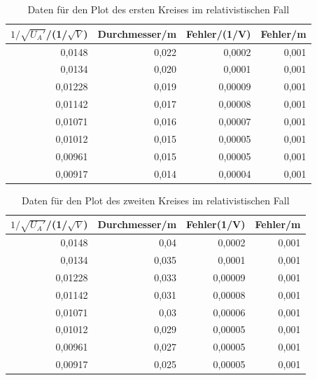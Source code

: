 \documentclass[12pt,a4paper]{article}
\begin{document}
\begin{table}[H]
\caption{Daten für den Plot des ersten Kreises im relativistischen Fall}
\begin{center}
\begin{tabular}{|r|r|r|r|}
\hline
\multicolumn{1}{|l|}{$1/\sqrt{U_A'}$/(1/$\sqrt{V}$)} & \multicolumn{1}{l|}{Durchmesser/m} & \multicolumn{1}{l|}{Fehler/(1/V)} & \multicolumn{1}{l|}{Fehler/m} \\ \hline
0,0148 & 0,022 & 0,0002 & 0,001 \\ \hline
0,0134 & 0,020 & 0,0001 & 0,001 \\ \hline
0,01228 & 0,019 & 0,00009 & 0,001 \\ \hline
0,01142 & 0,017 & 0,00008 & 0,001 \\ \hline
0,01071 & 0,016 & 0,00007 & 0,001 \\ \hline
0,01012 & 0,015 & 0,00005 & 0,001 \\ \hline
0,00961 & 0,015 & 0,00005 & 0,001 \\ \hline
0,00917 & 0,014 & 0,00004 & 0,001 \\ \hline
\end{tabular}
\end{center}
\label{tab:p_1_r}
\end{table}

\begin{table}[H]
\caption{Daten für den Plot des zweiten Kreises im relativistischen Fall}
\begin{center}
\begin{tabular}{|r|r|r|r|}
\hline
\multicolumn{1}{|l|}{$1/\sqrt{U_A'}$/(1/$\sqrt{V}$)} & \multicolumn{1}{l|}{Durchmesser/m} & \multicolumn{1}{l|}{Fehler(1/V)} & \multicolumn{1}{l|}{Fehler/m} \\ \hline
0,0148 & 0,04 & 0,0002 & 0,001 \\ \hline
0,0134 & 0,035 & 0,0001 & 0,001 \\ \hline
0,01228 & 0,033 & 0,00009 & 0,001 \\ \hline
0,01142 & 0,031 & 0,00008 & 0,001 \\ \hline
0,01071 & 0,03 & 0,00006 & 0,001 \\ \hline
0,01012 & 0,029 & 0,00005 & 0,001 \\ \hline
0,00961 & 0,027 & 0,00005 & 0,001 \\ \hline
0,00917 & 0,025 & 0,00005 & 0,001 \\ \hline
\end{tabular}
\end{center}
\label{tab:p_2_r}
\end{table}
\newpage
\end{document}

